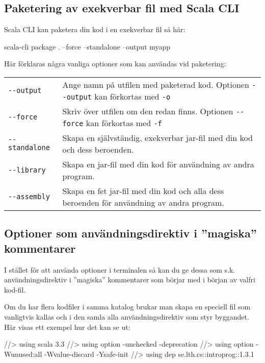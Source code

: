 \subsection{Paketering av exekverbar fil med Scala CLI}

\noindent Scala CLI kan paketera din kod i en exekverbar fil så här:
\begin{REPLsmall}
scala-cli package . --force --standalone --output myapp
\end{REPLsmall}

\noindent Här förklaras några vanliga optioner som kan användas vid paketering: 
\begin{table}[H]
\begin{tabular}{l p{8.5cm}}
\texttt{-{}-output} & Ange namn på utfilen med paketerad kod. Optionen \texttt{-{}-output} kan förkortas med \texttt{-o}\\
\texttt{-{}-force} & Skriv över utfilen om den redan finns. Optionen \texttt{-{}-force} kan förkortas med \texttt{-f} \\
\texttt{-{}-standalone} & Skapa en självständig, exekverbar jar-fil med din kod och dess beroenden.\\
\texttt{-{}-library} & Skapa en jar-fil med din kod för användning av andra program.\\
\texttt{-{}-assembly} & Skapa en fet jar-fil med din kod och alla dess beroenden för användning av andra program.\\
\end{tabular}
\end{table}

\subsection{Optioner som användningsdirektiv i ''magiska'' kommentarer}

\noindent I stället för att använda optioner i terminalen så kan du ge dessa som s.k. användningsdirektiv  i ''magiska'' kommentarer som börjar med  i början av valfri kod-fil. 

Om du har flera kodfiler i samma katalog brukar man skapa en speciell fil som vanligtvis kallas  och i den samla alla användningsdirektiv som styr byggandet. Här visas ett exempel hur det kan se ut:
\begin{Code}
//> using scala 3.3
//> using option -unchecked -deprecation 
//> using option -Wunused:all -Wvalue-discard -Ysafe-init
//> using dep se.lth.cs::introprog::1.3.1
\end{Code}

